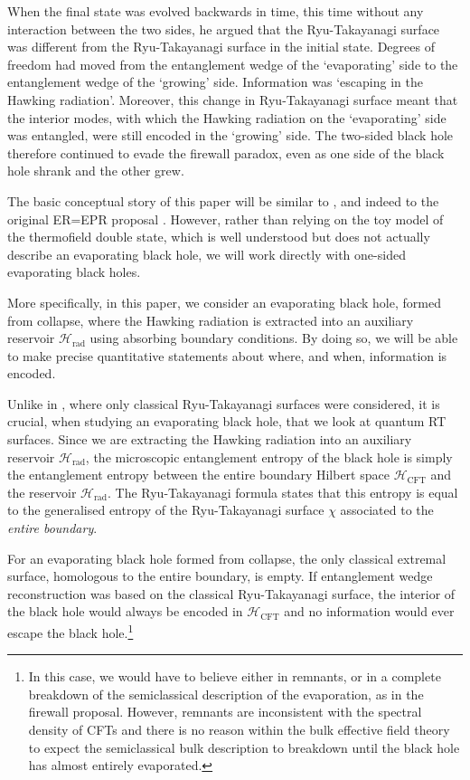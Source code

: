 \documentclass[12pt]{article}
\begin{document}
When the final state was evolved backwards in time, this time without any interaction between the two sides, he argued that the Ryu-Takayanagi surface was different from the Ryu-Takayanagi surface in the initial state. Degrees of freedom had moved from the entanglement wedge of the `evaporating' side to the entanglement wedge of the `growing' side. Information was `escaping in the Hawking radiation'. Moreover, this change in Ryu-Takayanagi surface meant that the interior modes, with which the Hawking radiation on the `evaporating' side was entangled, were still encoded in the `growing' side. The two-sided black hole therefore continued to evade the firewall paradox, even as one side of the black hole shrank and the other grew.

The basic conceptual story of this paper will be similar to \cite{almheiri2018holographic}, and indeed to the original ER=EPR proposal \cite{maldacena2013cool}. However, rather than relying on the toy model of the thermofield double state, which is well understood but does not actually describe an evaporating black hole, we will work directly with one-sided evaporating black holes. 

More specifically, in this paper, we consider an evaporating black hole, formed from collapse, where the Hawking radiation is extracted into an auxiliary reservoir $\mathcal{H}_\text{rad}$ using absorbing boundary conditions. By doing so, we will be able to make precise quantitative statements about where, and when, information is encoded. 

Unlike in \cite{almheiri2018holographic}, where only classical Ryu-Takayanagi surfaces were considered, it is crucial, when studying an evaporating black hole, that we look at quantum RT surfaces. Since we are extracting the Hawking radiation into an auxiliary reservoir $\mathcal{H}_\text{rad}$, the microscopic entanglement entropy of the black hole is simply the entanglement entropy between the entire boundary Hilbert space $\mathcal{H}_\text{CFT}$ and the reservoir $\mathcal{H}_\text{rad}$. The Ryu-Takayanagi formula states that this entropy is equal to the generalised entropy of the Ryu-Takayanagi surface $\chi$ associated to the \emph{entire boundary}. 

For an evaporating black hole formed from collapse, the only classical extremal surface, homologous to the entire boundary, is empty. If entanglement wedge reconstruction was based on the classical Ryu-Takayanagi surface, the interior of the black hole would always be encoded in $\mathcal{H}_\text{CFT}$ and no information would ever escape the black hole.\footnote{In this case, we would have to believe either in remnants, or in a complete breakdown of the semiclassical description of the evaporation, as in the firewall proposal. However, remnants are inconsistent with the spectral density of CFTs and there is no reason within the bulk effective field theory to expect the semiclassical bulk description to breakdown until the black hole has almost entirely evaporated.}
\end{document}
